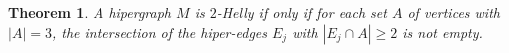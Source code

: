\documentclass[a4paper,11pt]{article}
\newtheorem{theorem}{Theorem}
\begin{document}
\begin{theorem} \citep{bergeDuchet1975} A hipergraph $M$ is $2$-Helly  if only if for each set $A$ of vertices with $|A| = 3$, the intersection of the hiper-edges $E_j$ with $|E_j \cap A|\geq 2$ is not empty. 
\end{theorem}




\end{document}
